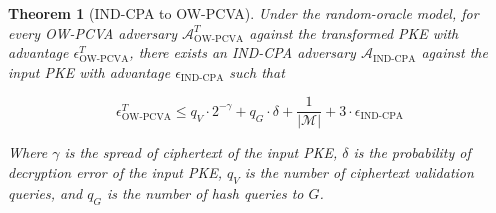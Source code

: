 \documentclass{article}
\newtheorem{theorem}{Theorem}[section]
\begin{document}
\begin{theorem}[IND-CPA to OW-PCVA]\label{cpa-to-pcva}
    Under the random-oracle model, for every OW-PCVA adversary $\mathcal{A}^T_\text{OW-PCVA}$ against the transformed PKE with advantage $\epsilon^T_\text{OW-PCVA}$, there exists an IND-CPA adversary $\mathcal{A}_\text{IND-CPA}$ against the input PKE with advantage $\epsilon_\text{IND-CPA}$ such that

    $$
    \epsilon^T_\text{OW-PCVA} 
        \leq q_V \cdot 2^{-\gamma} 
            + q_G \cdot \delta 
            + \frac{1}{\vert\mathcal{M}\vert}
            + 3\cdot\epsilon_\text{IND-CPA}
    $$

    Where $\gamma$ is the spread of ciphertext of the input PKE, $\delta$ is the probability of decryption error of the input PKE, $q_V$ is the number of ciphertext validation queries, and $q_G$ is the number of hash queries to $G$.
\end{theorem}
\end{document}
